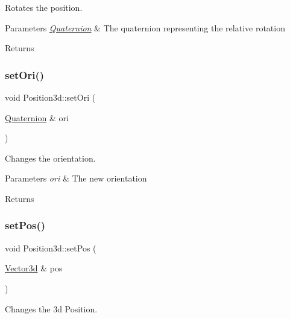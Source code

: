 Rotates the position. 


\begin{DoxyParams}{Parameters}
{\em \hyperlink{structQuaternion}{Quaternion}} & The quaternion representing the relative rotation\\
\hline
\end{DoxyParams}
\begin{DoxyReturn}{Returns}

\end{DoxyReturn}
\mbox{\label{classPosition3d_ae80dba5689430944acafac6d51280f51}} 
\subsubsection{\texorpdfstring{set\+Ori()}{setOri()}}
{\footnotesize\ttfamily void Position3d\+::set\+Ori (\begin{DoxyParamCaption}\item[{\hyperlink{structQuaternion}{Quaternion} \&}]{ori }\end{DoxyParamCaption})}



Changes the orientation. 


\begin{DoxyParams}{Parameters}
{\em ori} & The new orientation\\
\hline
\end{DoxyParams}
\begin{DoxyReturn}{Returns}

\end{DoxyReturn}
\mbox{\label{classPosition3d_affe1574abc035f3d7586be496d87ec9b}} 
\subsubsection{\texorpdfstring{set\+Pos()}{setPos()}}
{\footnotesize\ttfamily void Position3d\+::set\+Pos (\begin{DoxyParamCaption}\item[{\hyperlink{structVector3d}{Vector3d} \&}]{pos }\end{DoxyParamCaption})}



Changes the 3d Position. 


